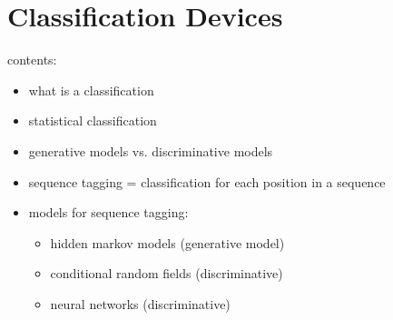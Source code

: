 \documentclass[../document.tex]{subfiles}
\begin{document}
    \section{Classification Devices}
    contents:
    \begin{itemize}
        \item what is a classification
        \item statistical classification
        \item generative models vs. discriminative models
        \item sequence tagging = classification for each position in a sequence

        \item models for sequence tagging:
        \begin{itemize}
            \item hidden markov models (generative model)
            \item conditional random fields (discriminative)
            \item neural networks (discriminative)
        \end{itemize}
    \end{itemize}


    \ifSubfilesClassLoaded{%
        \printindex
    }{}
\end{document}
